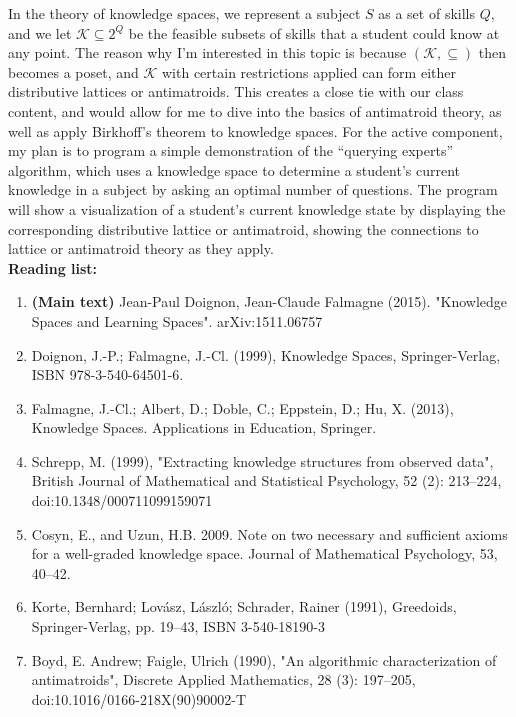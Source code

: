\documentclass[11pt,letterpaper,dvipsnames]{article}
\begin{document}
In the theory of knowledge spaces, we represent a subject $S$ as a set of skills $Q$, and we let $\mathcal{K}\subseteq 2^Q$ be the feasible subsets of skills that a student could know at any point. The reason why I'm interested in this topic is because $(\mathcal{K},\subseteq)$ then becomes a poset, and $\mathcal{K}$ with certain restrictions applied can form either distributive lattices or antimatroids. This creates a close tie with our class content, and would allow for me to dive into the basics of antimatroid theory, as well as apply Birkhoff's theorem to knowledge spaces. For the active component, my plan is to program a simple demonstration of the ``querying experts'' algorithm, which uses a knowledge space to determine a student's current knowledge in a subject by asking an optimal number of questions. The program will show a visualization of a student's current knowledge state by displaying the corresponding distributive lattice or antimatroid, showing the connections to lattice or antimatroid theory as they apply. \\
\textbf{Reading list:}
\begin{enumerate}
    \item \textbf{(Main text)} Jean-Paul Doignon, Jean-Claude Falmagne (2015). "Knowledge Spaces and Learning Spaces". arXiv:1511.06757
    \item Doignon, J.-P.; Falmagne, J.-Cl. (1999), Knowledge Spaces, Springer-Verlag, ISBN 978-3-540-64501-6.
    \item Falmagne, J.-Cl.; Albert, D.; Doble, C.; Eppstein, D.; Hu, X. (2013), Knowledge Spaces. Applications in Education, Springer.
    \item Schrepp, M. (1999), "Extracting knowledge structures from observed data", British Journal of Mathematical and Statistical Psychology, 52 (2): 213–224, doi:10.1348/000711099159071
    \item Cosyn, E., and Uzun, H.B. 2009. Note on two necessary and sufficient axioms for a well-graded knowledge space. Journal of Mathematical Psychology, 53, 40–42.
    \item Korte, Bernhard; Lovász, László; Schrader, Rainer (1991), Greedoids, Springer-Verlag, pp. 19–43, ISBN 3-540-18190-3
    \item Boyd, E. Andrew; Faigle, Ulrich (1990), "An algorithmic characterization of antimatroids", Discrete Applied Mathematics, 28 (3): 197–205, doi:10.1016/0166-218X(90)90002-T
\end{enumerate}
\end{document}
